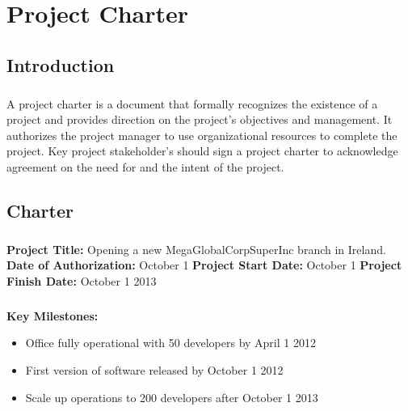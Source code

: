 \chapter{Project Charter}
\setcounter{page}{1}
	\section{Introduction}
		\paragraph{}
			\vspace{10mm}
				A project charter is a document that formally recognizes the existence of a project and 
				provides direction on the project’s objectives and management.  It authorizes the project 
				manager to use  organizational resources to complete the project.  Key project stakeholder’s 
				should sign a project charter to acknowledge agreement on the need for and the intent of the 
				project.
			\newline
				
	\section{Charter}
		\paragraph{}
			\vspace{10mm}
			\textbf{Project Title:} Opening a new MegaGlobalCorpSuperInc branch in Ireland.
			\newline\newline
			\textbf{Date of Authorization:} October 1
			\newline\newline
			\textbf{Project Start Date:} October 1
			\newline\newline
			\textbf{Project Finish Date:} October 1 2013
			\newline\newline
		
		\paragraph{}
			\vspace{5mm}
			\textbf{Key Milestones:} 
			\begin{itemize}
			\item Office fully operational with 50 developers by April 1 2012
			\item First version of software released by October 1 2012
			\item Scale up operations to 200 developers after October 1 2013
			\end{itemize}
				

